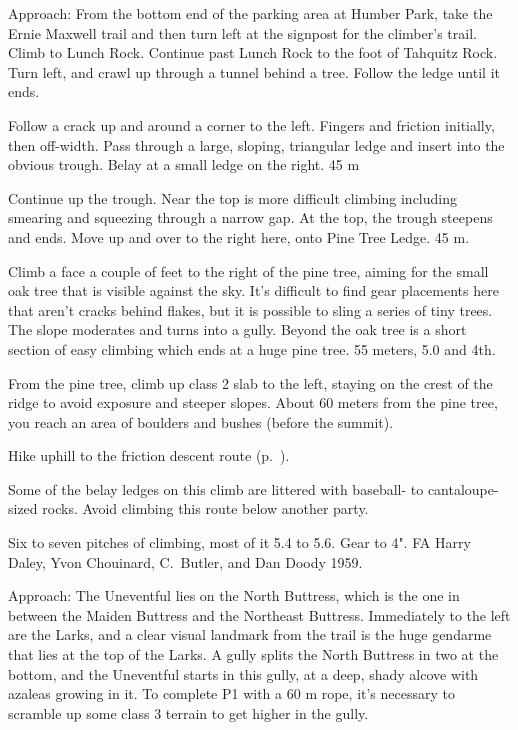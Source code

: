 \documentclass{tahquitz}
\begin{document}
Approach: From the bottom end of the parking area at Humber Park,
take the Ernie Maxwell trail and then turn left at the signpost for
the climber's trail. Climb to Lunch Rock. Continue past Lunch Rock to
the foot of Tahquitz Rock. Turn left, and crawl up through a tunnel
behind a tree. Follow the ledge until it ends.

 Follow a crack up and around a corner to the left. Fingers and
friction initially, then off-width. Pass through a large, sloping,
triangular ledge and insert into the obvious trough. Belay at a small
ledge on the right. 45 m

 Continue up the trough. Near the top is more difficult climbing
including smearing and squeezing through a narrow gap. At the top,
the trough steepens and ends. Move up and over to the right here,
onto Pine Tree Ledge. 45 m.

 Climb a face a couple of feet to the right of the pine tree,
aiming for the small oak tree that is visible against the sky. It's
difficult to find gear placements here that aren't cracks behind
flakes, but it is possible to sling a series of tiny trees. The slope
moderates and turns into a gully. Beyond the oak tree is a short
section of easy climbing which ends at a huge pine tree. 55 meters,
5.0 and 4th.

From the pine tree, climb up class 2 slab to the left, staying on
the crest of the ridge to avoid exposure and steeper slopes. About 60
meters from the pine tree, you reach an area of boulders and bushes
(before the summit).

Hike uphill to the friction descent route (p.~\pageref{subsec:friction-descent}).





Some of the belay ledges on this climb
are littered with baseball- to cantaloupe-sized rocks.
Avoid climbing this route below
another party.

Six to seven pitches of climbing, most of it 5.4 to 5.6. Gear to 4".
FA Harry Daley, Yvon Chouinard, C.~Butler, and Dan Doody 1959.

Approach: The Uneventful lies on the North Buttress, which is the one
in between the Maiden Buttress and the Northeast Buttress. Immediately
to the left are the Larks, and a clear visual landmark from the trail
is the huge gendarme that lies at the top of the Larks. A gully
splits the North Buttress in two at the bottom, and the Uneventful starts in this gully,
at a deep, shady alcove with azaleas
growing in it.
To complete P1 with a 60 m rope, it's necessary to scramble up some
class 3 terrain to get higher in the gully.
\end{document}
